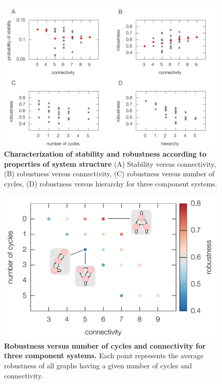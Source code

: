 \pagebreak

\begin{figure}[!ht]
\centering
\noindent\includegraphics[width=1.0\columnwidth]{fig/combinedfigs.pdf}
\caption{{\bf Characterization of stability and robustness according to properties of system structure} (A) Stability versus connectivity, (B) robustness versus connectivity, (C) robustness versus number of cycles, (D) robustness versus hierarchy for three component systems.
}
\label{fig:combined}
\end{figure}

\pagebreak

\begin{figure}[!ht]
\centering
\noindent\includegraphics[width=0.8\columnwidth]{fig/connectcycle3D3x3.pdf}
\caption{{\bf Robustness versus number of cycles and connectivity for three component systems.} Each point represents the average robustness of all graphs having a given number of cycles and connectivity.}
\label{fig:connectcycle3D3x3}
\end{figure}

